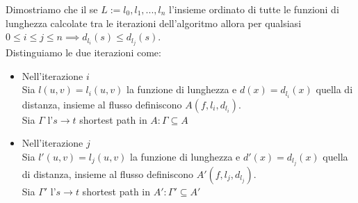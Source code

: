            Dimostriamo che il se $L:= {l_0, l_1, ..., l_n}$ l'insieme ordinato di tutte le funzioni di lunghezza
            calcolate tra le iterazioni dell'algoritmo allora per qualsiasi $0 \le i \le j \le n \implies d_{l_i}(s) \le d_{l_j}(s)$.\\
            Distinguiamo le due iterazioni come:
            \begin{itemize}
                \item Nell'iterazione $i$\\
                Sia $l(u,v) = l_i(u,v)$ la funzione di lunghezza e $d(x) = d_{l_i}(x)$ quella di distanza, insieme al flusso definiscono $A(f, l_i, d_{l_i})$.\\ Sia $\Gamma$ l'$s\rightarrow t$ shortest path in $A: \Gamma \subseteq A$
                \item Nell'iterazione $j$\\
                Sia $l'(u,v) = l_j(u,v)$ la funzione di lunghezza e $d'(x) = d_{l_j}(x)$ quella di distanza, insieme al flusso definiscono $A'(f, l_j, d_{l_j})$.\\ Sia $\Gamma'$ l'$s\rightarrow t$ shortest path in $A': \Gamma' \subseteq A'$
            \end{itemize}
            
